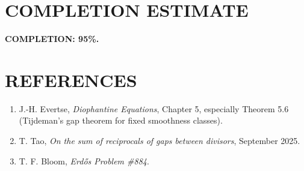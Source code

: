 \section{COMPLETION ESTIMATE}

\noindent \textbf{COMPLETION: 95\%.}

\section{REFERENCES}

\begin{enumerate}
\item J.-H. Evertse, \emph{Diophantine Equations}, Chapter 5, especially Theorem 5.6 (Tijdeman's gap theorem for fixed smoothness classes).
\item T. Tao, \emph{On the sum of reciprocals of gaps between divisors}, September 2025.
\item T. F. Bloom, \emph{Erd\H{o}s Problem \#884}.
\end{enumerate}

